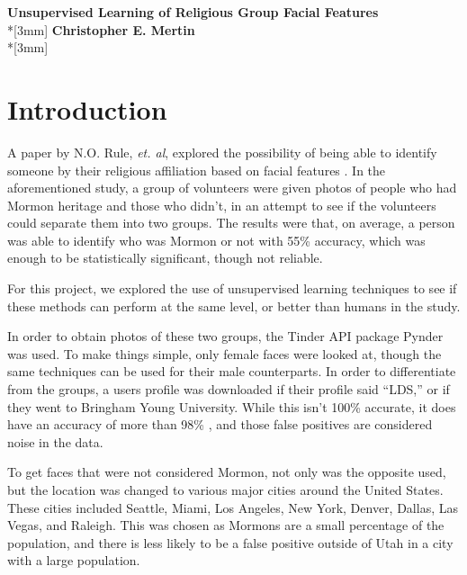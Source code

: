 \documentclass{article}
\begin{document}
\pagestyle{empty}
\begin{center}
{\Large{\bf Unsupervised Learning of Religious Group Facial Features}}\\*[3mm]
{\bf Christopher E. Mertin} \\*[3mm]
\end{center}


\section*{Introduction}

A paper by N.O. Rule, {\em et. al}, explored the possibility of being able to identify someone by their religious affiliation based on facial features \cite{MormonID}. In the aforementioned study, a group of volunteers were given photos of people who had Mormon heritage and those who didn't, in an attempt to see if the volunteers could separate them into two groups. The results were that, on average, a person was able to identify who was Mormon or not with 55\% accuracy, which was enough to be statistically significant, though not reliable.

For this project, we explored the use of unsupervised learning techniques to see if these methods can perform at the same level, or better than humans in the study.

In order to obtain photos of these two groups, the Tinder API package Pynder \cite{pynder} was used. To make things simple, only female faces were looked at, though the same techniques can be used for their male counterparts. In order to differentiate from the groups, a users profile was downloaded if their profile said ``LDS,'' or if they went to Bringham Young University. While this isn't 100\% accurate, it does have an accuracy of more than 98\% \cite{byu}, and those false positives are considered noise in the data.

To get faces that were not considered Mormon, not only was the opposite used, but the location was changed to various major cities around the United States. These cities included Seattle, Miami, Los Angeles, New York, Denver, Dallas, Las Vegas, and Raleigh. This was chosen as Mormons are a small percentage of the population, and there is less likely to be a false positive outside of Utah in a city with a large population.
\end{document}
